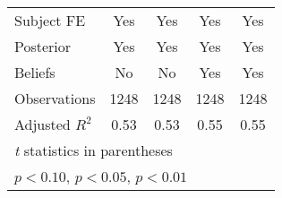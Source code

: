 {\begin{tabular}{l*{4}{c}}
Subject FE      &      Yes         &      Yes         &      Yes         &      Yes         \\
Posterior       &      Yes         &      Yes         &      Yes         &      Yes         \\
Beliefs         &       No         &       No         &      Yes         &      Yes         \\
\hline
Observations    &     1248         &     1248         &     1248         &     1248         \\
Adjusted \(R^{2}\)&     0.53         &     0.53         &     0.55         &     0.55         \\
\hline\hline
\multicolumn{5}{l}{\footnotesize \textit{t} statistics in parentheses}\\
\multicolumn{5}{l}{\footnotesize \sym{*} \(p<0.10\), \sym{**} \(p<0.05\), \sym{***} \(p<0.01\)}\\
\end{tabular}
}
